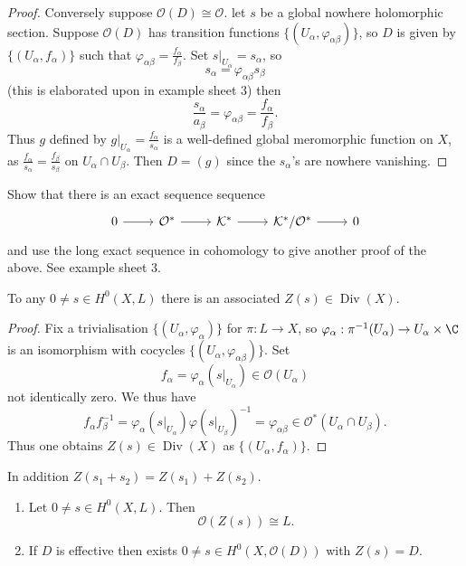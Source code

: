 \documentclass[a4paper]{article}
\DeclareMathOperator{\Div}{Div} %
\begin{document}
\begin{proof}
  Conversely suppose \(\mathcal O(D) \cong \mathcal O\). let \(s\) be a global nowhere holomorphic section. Suppose \(\mathcal O(D)\) has transition functions \(\{(U_\alpha, \varphi_{\alpha\beta})\}\), so \(D\) is given by \(\{(U_\alpha, f_\alpha)\}\) such that \(\varphi_{\alpha\beta} = \frac{f_\alpha}{f_\beta}\). Set \(s|_{U_\alpha} = s_\alpha\), so
  \[
    s_\alpha = \varphi_{\alpha\beta} s_\beta
  \]
  (this is elaborated upon in example sheet 3) then
  \[
    \frac{s_\alpha}{a_\beta} = \varphi_{\alpha\beta} = \frac{f_\alpha}{f_\beta}.
  \]
  Thus \(g\) defined by \(g|_{U_\alpha} = \frac{f_\alpha}{s_\alpha}\) is a well-defined global meromorphic function on \(X\), as \(\frac{f_\alpha}{s_\alpha} = \frac{f_\beta}{s_\beta}\) on \(U_\alpha \cap U_\beta\). Then \(D = (g)\) since the \(s_\alpha\)'s are nowhere vanishing.
\end{proof}

\begin{ex}
  Show that there is an exact sequence sequence
  \[
    \begin{tikzcd}
      0 \ar[r] & \mathcal O^* \ar[r] & \mathcal K^* \ar[r] & \mathcal K^*/\mathcal O^* \ar[r] & 0
    \end{tikzcd}
  \]
  and use the long exact sequence in cohomology to give another proof of the above. See example sheet 3.
\end{ex}

\begin{proposition}
  To any \(0 \neq s \in H^0(X, L)\) there is an associated \(Z(s) \in \Div(X)\).
\end{proposition}

\begin{proof}
  Fix a trivialisation \(\{(U_\alpha, \varphi_\alpha)\}\) for \(\pi: L \to X\), so \(\varphi_\alpha: \pi^{-1}(U_\alpha) \to U_\alpha \times \C\) is an isomorphism with cocycles \(\{(U_\alpha, \varphi_{\alpha\beta})\}\). Set
  \[
    f_\alpha = \varphi_\alpha(s|_{U_\alpha}) \in \mathcal O(U_\alpha)
  \]
  not identically zero. We thus have
  \[
    f_\alpha f_\beta^{-1}
    = \varphi_\alpha(s|_{U_\alpha}) \varphi(s|_{U_\beta})^{-1}
    = \varphi_{\alpha\beta} \in \mathcal O^*(U_\alpha \cap U_\beta).
  \]
  Thus one obtains \(Z(s) \in \Div(X)\) as \(\{(U_\alpha, f_\alpha)\}\).
\end{proof}
In addition \(Z(s_1 + s_2) = Z(s_1) + Z(s_2)\).

\begin{proposition}\leavevmode
  \begin{enumerate}
  \item Let \(0 \neq s \in H^0(X, L)\). Then
    \[
      \mathcal O(Z(s)) \cong L.
    \]
  \item If \(D\) is effective then exists \(0 \neq s \in H^0(X, \mathcal O(D))\) with \(Z(s) = D\).
  \end{enumerate}
\end{proposition}
\end{document}
